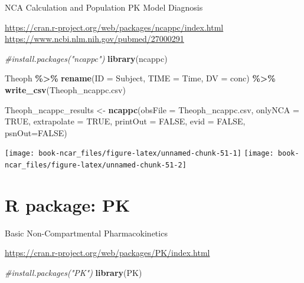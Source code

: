 \documentclass[
  10pt,
]{krantz}
\makeatletter
\newenvironment{Shaded}{\begin{snugshade}}{\end{snugshade}}
\newcommand{\CommentTok}[1]{\textcolor[rgb]{0.56,0.35,0.01}{\textit{#1}}}
\newcommand{\DataTypeTok}[1]{\textcolor[rgb]{0.13,0.29,0.53}{#1}}
\newcommand{\KeywordTok}[1]{\textcolor[rgb]{0.13,0.29,0.53}{\textbf{#1}}}
\newcommand{\NormalTok}[1]{#1}
\newcommand{\OperatorTok}[1]{\textcolor[rgb]{0.81,0.36,0.00}{\textbf{#1}}}
\newcommand{\OtherTok}[1]{\textcolor[rgb]{0.56,0.35,0.01}{#1}}
\newcommand{\StringTok}[1]{\textcolor[rgb]{0.31,0.60,0.02}{#1}}
\newenvironment{kframe}{%
\medskip{}
\setlength{\fboxsep}{.8em}
 \def\at@end@of@kframe{}%
 \ifinner\ifhmode%
  \def\at@end@of@kframe{\end{minipage}}%
  \begin{minipage}{\columnwidth}%
 \fi\fi%
 \def\FrameCommand##1{\hskip\@totalleftmargin \hskip-\fboxsep
 \colorbox{shadecolor}{##1}\hskip-\fboxsep
     \hskip-\linewidth \hskip-\@totalleftmargin \hskip\columnwidth}%
 \MakeFramed {\advance\hsize-\width
   \@totalleftmargin\z@ \linewidth\hsize
   \@setminipage}}%
 {\par\unskip\endMakeFramed%
 \at@end@of@kframe}
\renewenvironment{Shaded}{\begin{kframe}}{\end{kframe}}
\makeatother
\begin{document}
NCA Calculation and Population PK Model Diagnosis \citep{Acharya201683}

\url{https://cran.r-project.org/web/packages/ncappc/index.html}
\url{https://www.ncbi.nlm.nih.gov/pubmed/27000291}

\begin{Shaded}
\begin{Highlighting}[]
\CommentTok{\#install.packages("ncappc")}
\KeywordTok{library}\NormalTok{(ncappc)}
\end{Highlighting}
\end{Shaded}

\begin{Shaded}
\begin{Highlighting}[]
\NormalTok{Theoph }\OperatorTok{\%\textgreater{}\%}\StringTok{ }
\StringTok{  }\KeywordTok{rename}\NormalTok{(}\DataTypeTok{ID =}\NormalTok{ Subject,}
         \DataTypeTok{TIME =}\NormalTok{ Time,}
         \DataTypeTok{DV =}\NormalTok{ conc) }\OperatorTok{\%\textgreater{}\%}\StringTok{ }
\StringTok{  }\KeywordTok{write\_csv}\NormalTok{(}\StringTok{\textquotesingle{}Theoph\_ncappc.csv\textquotesingle{}}\NormalTok{)}

\NormalTok{Theoph\_ncappc\_results \textless{}{-}}\StringTok{ }\KeywordTok{ncappc}\NormalTok{(}\DataTypeTok{obsFile =} \StringTok{\textquotesingle{}Theoph\_ncappc.csv\textquotesingle{}}\NormalTok{,}
       \DataTypeTok{onlyNCA =} \OtherTok{TRUE}\NormalTok{,}
       \DataTypeTok{extrapolate =} \OtherTok{TRUE}\NormalTok{,}
       \DataTypeTok{printOut =} \OtherTok{FALSE}\NormalTok{,}
       \DataTypeTok{evid =} \OtherTok{FALSE}\NormalTok{,}
       \DataTypeTok{psnOut=}\OtherTok{FALSE}\NormalTok{)}
\end{Highlighting}
\end{Shaded}

\texttt{[image: book-ncar\_files/figure-latex/unnamed-chunk-51-1]}
\texttt{[image: book-ncar\_files/figure-latex/unnamed-chunk-51-2]}

\hypertarget{r-package-pk}{%
\section{R package: PK}\label{r-package-pk}}

Basic Non-Compartmental Pharmacokinetics

\url{https://cran.r-project.org/web/packages/PK/index.html}

\begin{Shaded}
\begin{Highlighting}[]
\CommentTok{\#install.packages("PK")}
\KeywordTok{library}\NormalTok{(PK)}
\end{Highlighting}
\end{Shaded}
\end{document}
